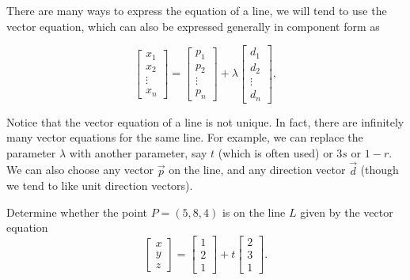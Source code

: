 \documentclass{ximera}
\begin{document}
There are many ways to express the equation of a line, we will tend to use the vector equation, which can also be expressed generally in component form as 

\begin{equation*}
  \begin{bmatrix} x_1 \\ x_2 \\ \vdots \\ x_n \end{bmatrix}
  = \begin{bmatrix} p_1 \\ p_2 \\ \vdots \\ p_n \end{bmatrix}
  + \lambda \begin{bmatrix} d_1 \\ d_2 \\ \vdots \\ d_n \end{bmatrix},
\end{equation*}

Notice that the vector equation of a line is not unique. In fact,
there are infinitely many vector equations for the same line. For
example, we can replace the parameter $\lambda$ with another parameter, say $t$ (which is often used) or 
$3s$ or $1-r$. We can also choose any vector $\vec{p}$ on the line, and any direction vector $\vec{d}$ (though we tend to like unit direction vectors).

\begin{example}\label{ex:point-on-line}

  Determine whether the point $P=(5,8,4)$ is on the line $L$ given by
  the vector equation
  \begin{equation*}
    \begin{bmatrix} x \\ y \\ z \end{bmatrix}
    = \begin{bmatrix} 1 \\ 2 \\ 1 \end{bmatrix}
    + t \begin{bmatrix} 2 \\ 3 \\ 1 \end{bmatrix}.
  \end{equation*}
\end{example}
\end{document}
